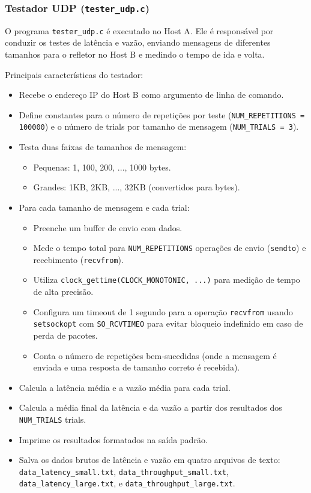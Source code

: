 \subsubsection{Testador UDP (\texttt{tester\_udp.c})}
O programa \texttt{tester\_udp.c} é executado no Host A. Ele é responsável por conduzir os testes de latência e vazão, enviando mensagens de diferentes tamanhos para o refletor no Host B e medindo o tempo de ida e volta.

Principais características do testador:
\begin{itemize}
    \item Recebe o endereço IP do Host B como argumento de linha de comando.
    \item Define constantes para o número de repetições por teste (\texttt{NUM\_REPETITIONS = 100000}) e o número de trials por tamanho de mensagem (\texttt{NUM\_TRIALS = 3}).
    \item Testa duas faixas de tamanhos de mensagem:
        \begin{itemize}
            \item Pequenas: 1, 100, 200, ..., 1000 bytes.
            \item Grandes: 1KB, 2KB, ..., 32KB (convertidos para bytes).
        \end{itemize}
    \item Para cada tamanho de mensagem e cada trial:
        \begin{itemize}
            \item Preenche um buffer de envio com dados.
            \item Mede o tempo total para \texttt{NUM\_REPETITIONS} operações de envio (\texttt{sendto}) e recebimento (\texttt{recvfrom}).
            \item Utiliza \texttt{clock\_gettime(CLOCK\_MONOTONIC, ...)} para medição de tempo de alta precisão.
            \item Configura um timeout de 1 segundo para a operação \texttt{recvfrom} usando \texttt{setsockopt} com \texttt{SO\_RCVTIMEO} para evitar bloqueio indefinido em caso de perda de pacotes.
            \item Conta o número de repetições bem-sucedidas (onde a mensagem é enviada e uma resposta de tamanho correto é recebida).
        \end{itemize}
    \item Calcula a latência média e a vazão média para cada trial.
    \item Calcula a média final da latência e da vazão a partir dos resultados dos \texttt{NUM\_TRIALS} trials.
    \item Imprime os resultados formatados na saída padrão.
    \item Salva os dados brutos de latência e vazão em quatro arquivos de texto: \texttt{data\_latency\_small.txt}, \texttt{data\_throughput\_small.txt}, \texttt{data\_latency\_large.txt}, e \texttt{data\_throughput\_large.txt}.
\end{itemize}

